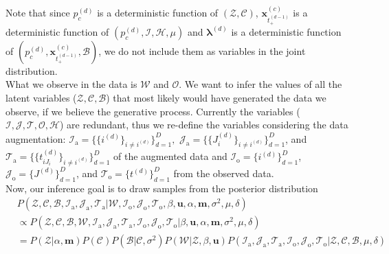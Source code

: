 \documentclass[a4paper]{article}
\begin{document}
	  Note that since $p_c^{(d)}$ is a deterministic function of $(\mathcal{Z}, \mathcal{C})$, $\boldsymbol{x}_{t_+^{(d-1)}}^{(c)}$ is a deterministic function of $(p_c^{(d)}, \mathcal{I}, \mathcal{H}, \mu)$  and $\boldsymbol{\lambda}^{(d)}$ is a deterministic function of $(p_c^{(d)}, \boldsymbol{x}_{t_+^{(d-1)}}^{(c)}, \mathcal{B})$, we do not include them as variables in the joint distribution. \\ \newline
	 What we observe in the data is $\mathcal{W}$ and $\mathcal{O}$. We want to infer the values of all the latent variables ($\mathcal{Z}, \mathcal{C}, \mathcal{B}$) that most likely would have generated the data we observe, if we believe the generative process. Currently the variables ($\mathcal{I},\mathcal{J}, \mathcal{T}, \mathcal{O}, \mathcal{H}$) are redundant, thus we re-define the variables considering the data augmentation:  $\mathcal{I}_{\mbox{a}}=\{\{i^{(d)}\}_{i\neq i^{(d)}}\}_{d=1}^D,$  $\mathcal{J}_{\mbox{a}}=\{\{J_i^{(d)}\}_{i\neq i^{(d)}}\}_{d=1}^D$, and $\mathcal{T}_{\mbox{a}}=\{\{t_{iJ_i}^{(d)}\}_{i\neq i^{(d)}}\}_{d=1}^D$ of the augmented data and $\mathcal{I}_{\mbox{o}}=\{i^{(d)}\}_{d=1}^D$,  $\mathcal{J}_{\mbox{o}}=\{J^{(d)}\}_{d=1}^D$, and $\mathcal{T}_{\mbox{o}}= \{t^{(d)}\}_{d=1}^D$ from the observed data.\\ \newline
	  Now, our inference goal is to draw samples from the posterior distribution
	  \begin{equation}
	  \begin{aligned}
	  &P(\mathcal{Z}, \mathcal{C}, \mathcal{B}, \mathcal{I}_{\mbox{a}}, \mathcal{J}_{\mbox{a}}, \mathcal{T}_{\mbox{a}}|\mathcal{W}, \mathcal{I}_{\mbox{o}}, \mathcal{J}_{\mbox{o}}, \mathcal{T}_{\mbox{o}}, \beta, \boldsymbol{u}, \alpha, \boldsymbol{m}, \sigma^2, \mu, \delta) \\
	  &\propto 	P(\mathcal{Z}, \mathcal{C}, \mathcal{B}, \mathcal{W}, \mathcal{I}_{\mbox{a}}, \mathcal{J}_{\mbox{a}}, \mathcal{T}_{\mbox{a}},\mathcal{I}_{\mbox{o}}, \mathcal{J}_{\mbox{o}}, \mathcal{T}_{\mbox{o}} |\beta, \boldsymbol{u}, \alpha, \boldsymbol{m}, \sigma^2, \mu, \delta)\\&  = P(\mathcal{Z}|\alpha, \boldsymbol{m})P(\mathcal{C})P(\mathcal{B}|\mathcal{C}, \sigma^2)P(\mathcal{W}|\mathcal{Z}, \beta, \boldsymbol{u})P(\mathcal{I}_{\mbox{a}}, \mathcal{J}_{\mbox{a}}, \mathcal{T}_{\mbox{a}},\mathcal{I}_{\mbox{o}}, \mathcal{J}_{\mbox{o}}, \mathcal{T}_{\mbox{o}} |\mathcal{Z}, \mathcal{C}, \mathcal{B}, \mu, \delta)
	  \end{aligned}
	  \end{equation}
\end{document}
